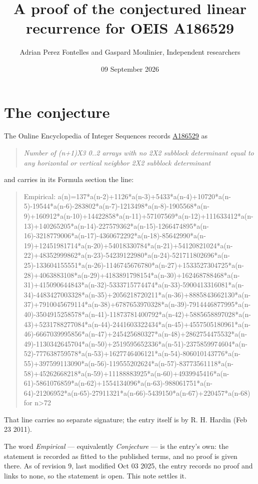 \documentclass[11pt]{article}
\title{A proof of the conjectured linear recurrence for OEIS A186529}
\author{Adrian Perez Fontelles and Gaspard Moulinier, Independent researchers}
\date{09 September 2026}
\theoremstyle{definition}
\begin{document}
\maketitle
\section{The conjecture}

The Online Encyclopedia of Integer Sequences records \href{https://oeis.org/A186529}{A186529} as

\begin{quote}\itshape Number of (n+1)X3 0..2 arrays with no 2X2 subblock determinant equal to any horizontal or vertical neighbor 2X2 subblock determinant\end{quote}

and carries in its Formula section the line:

\begin{quote}\ttfamily Empirical: a(n)=137*a(n-2)+1126*a(n-3)+5433*a(n-4)+10720*a(n-5)-19544*a(n-6)-283802*a(n-7)-1213498*a(n-8)-1905568*a(n-9)+160912*a(n-10)+14422858*a(n-11)+57107569*a(n-12)+111633412*a(n-13)+140265205*a(n-14)-227579362*a(n-15)-1266474895*a(n-16)-3218779006*a(n-17)-4360672292*a(n-18)-85642990*a(n-19)+12451981714*a(n-20)+54018330784*a(n-21)+54120821024*a(n-22)+48352999862*a(n-23)-54239122980*a(n-24)-521711802696*a(n-25)-133604155551*a(n-26)-1146745676780*a(n-27)+1533527304725*a(n-28)+4063883108*a(n-29)+4183891798154*a(n-30)+162468788468*a(n-31)+415090644843*a(n-32)-5333715774474*a(n-33)-5900413316081*a(n-34)-4483427003328*a(n-35)+2056218720211*a(n-36)+8885843662130*a(n-37)+7910045679114*a(n-38)+6787653970328*a(n-39)-7914446877995*a(n-40)-3504915258578*a(n-41)-11873781400792*a(n-42)+5885658897028*a(n-43)+5231788277084*a(n-44)-2441603322434*a(n-45)+4557505180961*a(n-46)-6667039995856*a(n-47)+245425680327*a(n-48)+2862754475532*a(n-49)-1130342645704*a(n-50)+2519595652336*a(n-51)-2375859974604*a(n-52)-777638759578*a(n-53)+1627746406121*a(n-54)-806010143776*a(n-55)+397599113090*a(n-56)-119555202624*a(n-57)-83773561118*a(n-58)+45262668218*a(n-59)+11188883925*a(n-60)+4939945416*a(n-61)-5861076859*a(n-62)+1554134096*a(n-63)-988061751*a(n-64)-21206952*a(n-65)-27911321*a(n-66)-5439150*a(n-67)+220457*a(n-68) for n>72\end{quote}

That line carries no separate signature; the entry itself is by R. H. Hardin (Feb 23 2011).

The word {\itshape Empirical} --- equivalently {\itshape Conjecture} --- is the entry's own: the statement is recorded as fitted to the published terms, and no proof is given there. As of revision 9, last modified Oct 03 2025, the entry records no proof and links to none, so the statement is open. This note settles it.
\end{document}
